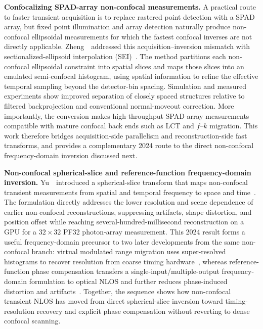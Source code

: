 \vspace{0.8mm}
\noindent \textbf{Confocalizing SPAD-array non-confocal measurements.}
A practical route to faster transient acquisition is to replace rastered point detection with a SPAD array, but fixed point illumination and array detection naturally produce non-confocal ellipsoidal measurements for which the fastest confocal inverses are not directly applicable. Zheng~\etal~addressed this acquisition--inversion mismatch with sectionalized-ellipsoid interpolation (SEI)~\cite{zhengSemiConfocalNLOS2024}. The method partitions each non-confocal ellipsoidal constraint into spatial slices and maps those slices into an emulated semi-confocal histogram, using spatial information to refine the effective temporal sampling beyond the detector-bin spacing. Simulation and measured experiments show improved separation of closely spaced structures relative to filtered backprojection and conventional normal-moveout correction. More importantly, the conversion makes high-throughput SPAD-array measurements compatible with mature confocal back ends such as LCT and $f$--$k$ migration. This work therefore bridges acquisition-side parallelism and reconstruction-side fast transforms, and provides a complementary 2024 route to the direct non-confocal frequency-domain inversion discussed next.

\vspace{0.8mm}
\noindent \textbf{Non-confocal spherical-slice and reference-function frequency-domain inversion.}
Yu~\etal~introduced a spherical-slice transform that maps non-confocal transient measurements from spatial and temporal frequency to space and time~\cite{yuSphericalSliceNonconfocalNLOS2024}. The formulation directly addresses the lower resolution and scene dependence of earlier non-confocal reconstructions, suppressing artifacts, shape distortion, and position offset while reaching several-hundred-millisecond reconstruction on a GPU for a $32\times32$ PF32 photon-array measurement. This 2024 result forms a useful frequency-domain precursor to two later developments from the same non-confocal branch: virtual modulated range migration uses super-resolved histograms to recover resolution from coarse timing hardware~\cite{tianVirtualRMAHistograms2025}, whereas reference-function phase compensation transfers a single-input/multiple-output frequency-domain formulation to optical NLOS and further reduces phase-induced distortion and artifacts~\cite{yuNonconfocalPhaseCompensation2026}. Together, the sequence shows how non-confocal transient NLOS has moved from direct spherical-slice inversion toward timing-resolution recovery and explicit phase compensation without reverting to dense confocal scanning.

